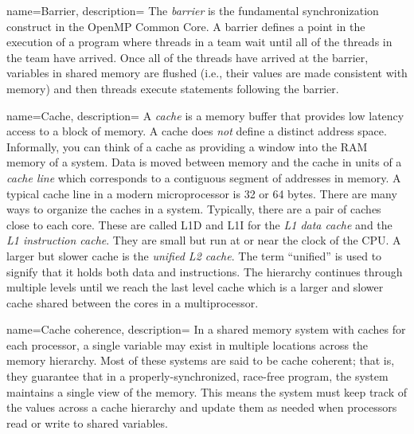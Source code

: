 {
   name={Barrier},
   description={
   The \emph{barrier} is the fundamental synchronization construct in the OpenMP Common Core. A barrier defines a point
   in the execution of a program where threads in a team wait until all of the threads in the team
   have arrived.  Once all of the threads have arrived at the barrier, variables in shared memory 
   are flushed (i.e., their values are made consistent with memory) and then threads execute statements
   following the barrier. 
   }
}   

{
   name={Cache},
   description={
          A \emph{cache} is a memory buffer that provides low latency access to a block of memory.  A cache does \emph{not}
          define a distinct address space.  Informally, you can think of a cache as providing a window into
          the RAM memory of a system.
          Data is moved between memory and the
          cache in units of a \emph{cache line}
         which corresponds to a contiguous segment of addresses in memory.  A typical cache
         line in a modern microprocessor is 32 or 64 bytes.  There are many ways to organize the 
         caches in a system.  Typically, there are a pair of caches close to each core.  These are 
         called L1D and L1I for the \emph{L1 data cache} and the \emph{L1 instruction cache}.  They are small
         but run at or near the clock of the CPU.  A larger but slower cache is the \emph{unified L2 cache}.
         The term ``unified'' is used to signify that it holds both data and instructions.  The hierarchy 
         continues through multiple levels until we reach the last level cache which is a larger and slower
         cache shared between the cores in a multiprocessor.  
         }
}

{
   name={Cache coherence},
   description={
          In a shared memory system with caches for each processor, a single variable may exist
          in multiple locations across the memory hierarchy.  Most of these systems are said to be
          cache coherent; that is, they guarantee that in a properly-synchronized,
          race-free program, the system maintains a single view of the memory. This means
          the system must keep track of the values across a cache hierarchy and update them as needed
          when processors read or write to shared variables. 
         }
}

